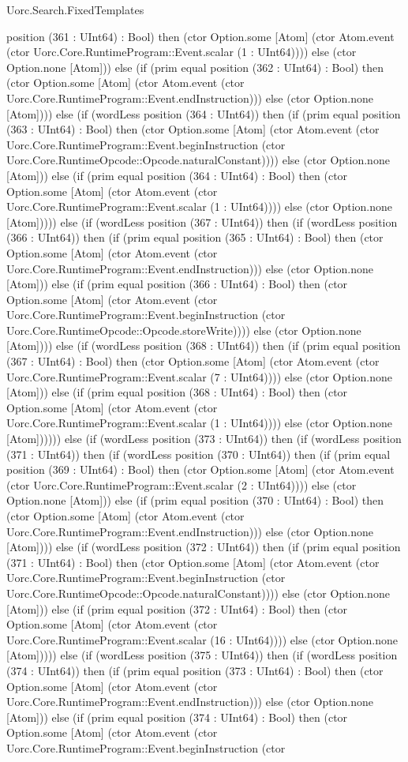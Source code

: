\begin{lexlean}{Uorc.Search.FixedTemplates}
\begin{semanticmodule}
{position (361 : UInt64) : Bool) then (ctor Option.some [Atom] (ctor Atom.event (ctor Uorc.Core.RuntimeProgram::Event.scalar (1 : UInt64)))) else (ctor Option.none [Atom])) else (if (prim equal position (362 : UInt64) : Bool) then (ctor Option.some [Atom] (ctor Atom.event (ctor Uorc.Core.RuntimeProgram::Event.endInstruction))) else (ctor Option.none [Atom]))) else (if (wordLess position (364 : UInt64)) then (if (prim equal position (363 : UInt64) : Bool) then (ctor Option.some [Atom] (ctor Atom.event (ctor Uorc.Core.RuntimeProgram::Event.beginInstruction (ctor Uorc.Core.RuntimeOpcode::Opcode.naturalConstant)))) else (ctor Option.none [Atom])) else (if (prim equal position (364 : UInt64) : Bool) then (ctor Option.some [Atom] (ctor Atom.event (ctor Uorc.Core.RuntimeProgram::Event.scalar (1 : UInt64)))) else (ctor Option.none [Atom])))) else (if (wordLess position (367 : UInt64)) then (if (wordLess position (366 : UInt64)) then (if (prim equal position (365 : UInt64) : Bool) then (ctor Option.some [Atom] (ctor Atom.event (ctor Uorc.Core.RuntimeProgram::Event.endInstruction))) else (ctor Option.none [Atom])) else (if (prim equal position (366 : UInt64) : Bool) then (ctor Option.some [Atom] (ctor Atom.event (ctor Uorc.Core.RuntimeProgram::Event.beginInstruction (ctor Uorc.Core.RuntimeOpcode::Opcode.storeWrite)))) else (ctor Option.none [Atom]))) else (if (wordLess position (368 : UInt64)) then (if (prim equal position (367 : UInt64) : Bool) then (ctor Option.some [Atom] (ctor Atom.event (ctor Uorc.Core.RuntimeProgram::Event.scalar (7 : UInt64)))) else (ctor Option.none [Atom])) else (if (prim equal position (368 : UInt64) : Bool) then (ctor Option.some [Atom] (ctor Atom.event (ctor Uorc.Core.RuntimeProgram::Event.scalar (1 : UInt64)))) else (ctor Option.none [Atom]))))) else (if (wordLess position (373 : UInt64)) then (if (wordLess position (371 : UInt64)) then (if (wordLess position (370 : UInt64)) then (if (prim equal position (369 : UInt64) : Bool) then (ctor Option.some [Atom] (ctor Atom.event (ctor Uorc.Core.RuntimeProgram::Event.scalar (2 : UInt64)))) else (ctor Option.none [Atom])) else (if (prim equal position (370 : UInt64) : Bool) then (ctor Option.some [Atom] (ctor Atom.event (ctor Uorc.Core.RuntimeProgram::Event.endInstruction))) else (ctor Option.none [Atom]))) else (if (wordLess position (372 : UInt64)) then (if (prim equal position (371 : UInt64) : Bool) then (ctor Option.some [Atom] (ctor Atom.event (ctor Uorc.Core.RuntimeProgram::Event.beginInstruction (ctor Uorc.Core.RuntimeOpcode::Opcode.naturalConstant)))) else (ctor Option.none [Atom])) else (if (prim equal position (372 : UInt64) : Bool) then (ctor Option.some [Atom] (ctor Atom.event (ctor Uorc.Core.RuntimeProgram::Event.scalar (16 : UInt64)))) else (ctor Option.none [Atom])))) else (if (wordLess position (375 : UInt64)) then (if (wordLess position (374 : UInt64)) then (if (prim equal position (373 : UInt64) : Bool) then (ctor Option.some [Atom] (ctor Atom.event (ctor Uorc.Core.RuntimeProgram::Event.endInstruction))) else (ctor Option.none [Atom])) else (if (prim equal position (374 : UInt64) : Bool) then (ctor Option.some [Atom] (ctor Atom.event (ctor Uorc.Core.RuntimeProgram::Event.beginInstruction (ctor }
\end{semanticmodule}
\end{lexlean}
